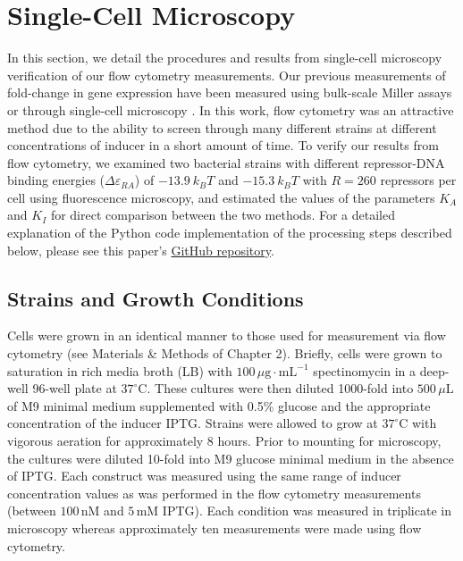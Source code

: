 \documentclass[12pt]{caltech_thesis}
\begin{document}
\hypertarget{single-cell-microscopy}{%
\section{Single-Cell Microscopy}\label{single-cell-microscopy}}

In this section, we detail the procedures and results from single-cell
microscopy verification of our flow cytometry measurements. Our previous
measurements of fold-change in gene expression have been measured using
bulk-scale Miller assays \autocite{garcia2011} or through single-cell
microscopy \autocite{brewster2014}. In this work, flow cytometry was an
attractive method due to the ability to screen through many different
strains at different concentrations of inducer in a short amount of
time. To verify our results from flow cytometry, we examined two
bacterial strains with different repressor-DNA binding energies
(\(\Delta\varepsilon_{RA}\)) of \(-13.9~k_BT\) and \(-15.3~k_BT\) with
\(R = 260\) repressors per cell using fluorescence microscopy, and
estimated the values of the parameters \(K_A\) and \(K_I\) for direct
comparison between the two methods. For a detailed explanation of the
Python code implementation of the processing steps described below,
please see this paper's
\href{https://rpgroup-pboc.github.io/mwc_induction/code/notebooks/unsupervised_gating.html}{GitHub
repository}.

\hypertarget{strains-and-growth-conditions}{%
\subsection{Strains and Growth
Conditions}\label{strains-and-growth-conditions}}

Cells were grown in an identical manner to those used for measurement
via flow cytometry (see Materials \& Methods of Chapter 2). Briefly,
cells were grown to saturation in rich media broth (LB) with
\(100\,\mu\text{g} \cdot \text{mL}^{-1}\) spectinomycin in a deep-well
96-well plate at \(37^\circ \text{C}\). These cultures were then diluted
1000-fold into \(500\,\mu\text{L}\) of M9 minimal medium supplemented
with 0.5\% glucose and the appropriate concentration of the inducer
IPTG. Strains were allowed to grow at \(37^\circ \text{C}\) with
vigorous aeration for approximately 8 hours. Prior to mounting for
microscopy, the cultures were diluted 10-fold into M9 glucose minimal
medium in the absence of IPTG. Each construct was measured using the
same range of inducer concentration values as was performed in the flow
cytometry measurements (between \(100\,\text{nM}\) and \(5\,\text{mM}\)
IPTG). Each condition was measured in triplicate in microscopy whereas
approximately ten measurements were made using flow cytometry.
\end{document}
